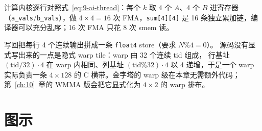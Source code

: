 



计算内核逐行对照式~\ref{eq:9-ai-thread}：每个 $k$ 取 4 个 $A$、4 个 $B$ 进寄存器
（\texttt{a\_vals}/\texttt{b\_vals}），做 $4 \times 4 = 16$ 次 FMA，\texttt{sum[4][4]}
是 16 条独立累加链，编译器可以充分乱序；16 次 FMA 只花 8 次 smem 读。



写回把每行 4 个连续输出拼成一条 \texttt{float4} store（要求 $N \% 4 = 0$）。
源码没有显式写出来的一点是隐式 warp tile：warp 由 32 个连续 tid 组成，
行基址 $(\mathrm{tid}/32) \cdot 4$ 在 warp 内相同、列基址
$(\mathrm{tid}\%32) \cdot 4$ 以 4 递增，于是一个 warp 实际负责一条
$4 \times 128$ 的 C 横带。金字塔的 warp 级在本章无需额外代码；
第~\ref{ch:10}~章的 WMMA 版会把它显式化为 $4 \times 2$ 的 warp 排布。

\section{图示}

